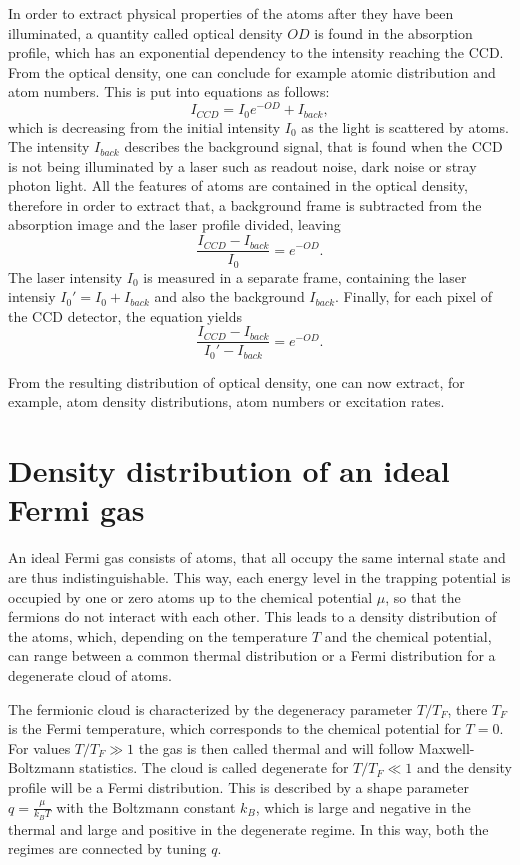 In order to extract physical properties of the atoms after they have been illuminated, a quantity called optical density $OD$ is found in the absorption profile, which has an exponential dependency to the intensity reaching the CCD. From the optical density, one can conclude for example atomic distribution and atom numbers.
This is put into equations as follows\cite{Ketterle1999}:
\begin{equation}
I_{CCD} = I_0 e^{-OD} + I_{back},
\end{equation}
which is decreasing from the initial intensity $I_0$ as the light is scattered by atoms. The intensity $I_{back}$ describes the background signal, that is found when the CCD is not being illuminated by a laser such as readout noise, dark noise or stray photon light. All the features of atoms are contained in the optical density, therefore in order to extract that, a background frame is subtracted from the absorption image and the laser profile divided, leaving
\begin{equation}
\frac{I_{CCD} - I_{back}}{I_0} = e^{-OD}.
\end{equation}
The laser intensity $I_0$ is measured in a separate frame, containing the laser intensiy $I_0' = I_0 + I_{back}$ and also the background $I_{back}$. Finally, for each pixel of the CCD detector, the equation yields
\begin{equation}
\frac{I_{CCD} - I_{back}}{I_0' - I_{back}} = e^{-OD}.
\end{equation}

From the resulting distribution of optical density, one can now extract, for example, atom density distributions, atom numbers or excitation rates.

\section{Density distribution of an ideal Fermi gas}
\label{sec:densdistrfermi}

An ideal Fermi gas consists of atoms, that all occupy the same internal state and are thus indistinguishable. This way, each energy level in the trapping potential is occupied by one or zero atoms up to the chemical potential $\mu$, so that the fermions do not interact with each other. This leads to a density distribution of the atoms, which, depending on the temperature $T$ and the chemical potential, can range between a common thermal distribution or a Fermi distribution for a degenerate cloud of atoms.

The fermionic cloud is characterized by the degeneracy parameter $T/T_F$, there $T_F$ is the Fermi temperature, which corresponds to the chemical potential for $T=0$. For values $T/T_F \gg 1$ the gas is then called thermal and will follow Maxwell-Boltzmann statistics. The cloud is called degenerate for $T/T_F \ll 1$ and the density profile will be a Fermi distribution. This is described by a shape parameter $q=\frac{\mu}{k_BT}$ with the Boltzmann constant $k_B$, which is large and negative in the thermal and large and positive in the degenerate regime. In this way, both the regimes are connected by tuning $q$.

